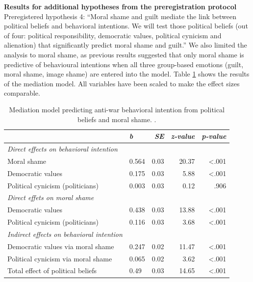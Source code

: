 \documentclass[
]{article}
\begin{document}
\textbf{Results for additional hypotheses from the preregistration protocol}
Preregistered hypothesis 4: ``Moral shame and guilt mediate the link between political beliefs and behavioral intentions. We will test those political beliefs (out of four: political responsibility, democratic values, political cynicism and alienation) that significantly predict moral shame and guilt.''
We also limited the analysis to moral shame, as previous results suggested that only moral shame is predictive of behavioural intentions when all three group-based emotions (guilt, moral shame, image shame) are entered into the model. Table \ref{tab:TableS5} shows the results of the mediation model. All variables have been scaled to make the effect sizes comparable.

\begin{table}[H]
\centering
\caption{\label{tab:TableS5}Mediation model predicting anti-war behavioral intention from political beliefs and moral shame. .}
\centering
\fontsize{8}{10}\selectfont
\begin{tabular}[t]{llrrr}
\toprule
\em{ } & \em{b} & \em{SE} & \em{z-value} & \em{p-value}\\
\midrule
\em{Direct effects on behavioral intention} & \em{} & \em{} & \em{} & \em{}\\
\hspace{1em}Moral shame & 0.564 & 0.03 & 20.37 & <.001\\
\hspace{1em}Democratic values & 0.175 & 0.03 & 5.88 & <.001\\
\hspace{1em}Political cynicism (politicians) & 0.003 & 0.03 & 0.12 & .906\\
\em{Direct effets on moral shame} & \em{} & \em{} & \em{} & \em{}\\
\hspace{1em}Democratic values & 0.438 & 0.03 & 13.88 & <.001\\
\hspace{1em}Political cynicism (politicians) & 0.116 & 0.03 & 3.68 & <.001\\
\em{Indirect effects on behavioral intention} & \em{} & \em{} & \em{} & \em{}\\
\hspace{1em}Democratic values via moral shame & 0.247 & 0.02 & 11.47 & <.001\\
\hspace{1em}Political cynicism via moral shame & 0.065 & 0.02 & 3.62 & <.001\\
\hspace{1em}Total effect of political beliefs & 0.49 & 0.03 & 14.65 & <.001\\
\bottomrule
\end{tabular}
\end{table}
\end{document}

